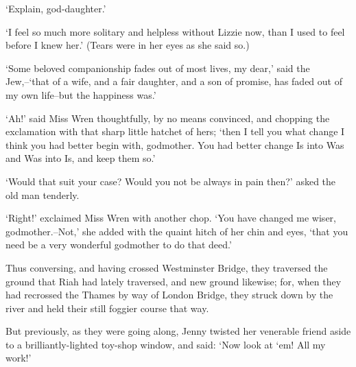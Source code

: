 ‘Explain, god-daughter.’

‘I feel so much more solitary and helpless without Lizzie now, than I
used to feel before I knew her.’ (Tears were in her eyes as she said
so.)

‘Some beloved companionship fades out of most lives, my dear,’ said the
Jew,--‘that of a wife, and a fair daughter, and a son of promise, has
faded out of my own life--but the happiness was.’

‘Ah!’ said Miss Wren thoughtfully, by no means convinced, and chopping
the exclamation with that sharp little hatchet of hers; ‘then I tell you
what change I think you had better begin with, godmother. You had better
change Is into Was and Was into Is, and keep them so.’

‘Would that suit your case? Would you not be always in pain then?’ asked
the old man tenderly.

‘Right!’ exclaimed Miss Wren with another chop. ‘You have changed me
wiser, godmother.--Not,’ she added with the quaint hitch of her chin and
eyes, ‘that you need be a very wonderful godmother to do that deed.’

Thus conversing, and having crossed Westminster Bridge, they traversed
the ground that Riah had lately traversed, and new ground likewise; for,
when they had recrossed the Thames by way of London Bridge, they struck
down by the river and held their still foggier course that way.

But previously, as they were going along, Jenny twisted her venerable
friend aside to a brilliantly-lighted toy-shop window, and said: ‘Now
look at ‘em! All my work!’

